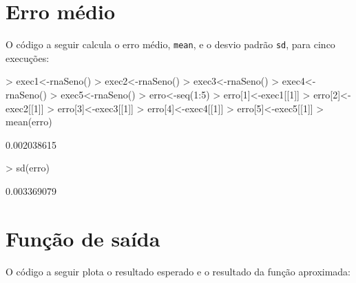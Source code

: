\documentclass{article}
\begin{document}
\section{Erro médio}

O código a seguir calcula o erro médio, \texttt{mean}, e o desvio padrão \texttt{sd}, para cinco execuções:

\begin{Schunk}
\begin{Sinput}
>   exec1<-rnaSeno()
>   exec2<-rnaSeno()
>   exec3<-rnaSeno()
>   exec4<-rnaSeno()
>   exec5<-rnaSeno()
>   erro<-seq(1:5)
>   erro[1]<-exec1[[1]]
>   erro[2]<-exec2[[1]]
>   erro[3]<-exec3[[1]]
>   erro[4]<-exec4[[1]]
>   erro[5]<-exec5[[1]]
>   mean(erro)
\end{Sinput}
\begin{Soutput}
[1] 0.002038615
\end{Soutput}
\begin{Sinput}
>   sd(erro)
\end{Sinput}
\begin{Soutput}
[1] 0.003369079
\end{Soutput}
\end{Schunk}

\section{Função de saída}

O código a seguir plota o resultado esperado e o resultado da função aproximada:
\end{document}
